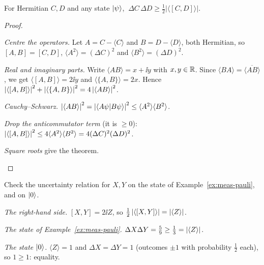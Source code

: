 \begin{theorem}\label{thm:uncertainty}
  For Hermitian $C,D$ and any state $\left|\psi\right\rangle$, $\ \Delta C\,\Delta D\ge\tfrac12\bigl|\langle[C,D]\rangle\bigr|$.
\end{theorem}
\begin{proof}
  \begin{steps}
    \item \emph{Centre the operators.} Let $A=C-\langle C\rangle$ and $B=D-\langle D\rangle$, both Hermitian, so $[A,B]=[C,D]$, $\langle A^2\rangle=(\Delta C)^2$ and $\langle B^2\rangle=(\Delta D)^2$.
    \item \emph{Real and imaginary parts.} Write $\langle AB\rangle=x+\ii y$ with $x,y\in\mathbb{R}$. Since $\langle BA\rangle=\overline{\langle AB\rangle}$, we get $\langle[A,B]\rangle=2\ii y$ and $\langle\{A,B\}\rangle=2x$. Hence $\left|\langle[A,B]\rangle\right|^2+\left|\langle\{A,B\}\rangle\right|^2=4\left|\langle AB\rangle\right|^2$.
    \item \emph{Cauchy--Schwarz.} $\left|\langle AB\rangle\right|^2=\left|\left\langle A\psi\middle|B\psi\right\rangle\right|^2\le\langle A^2\rangle\langle B^2\rangle$.
    \item \emph{Drop the anticommutator term} (it is $\ge0$): $\left|\langle[A,B]\rangle\right|^2\le4\langle A^2\rangle\langle B^2\rangle=4(\Delta C)^2(\Delta D)^2$.
    \item \emph{Square roots} give the theorem. \qedhere
  \end{steps}
\end{proof}

\begin{example}\label{ex:uncertainty-check}
  Check the uncertainty relation for $X,Y$ on the state of Example~\ref{ex:meas-pauli}, and on $\left|0\right\rangle$.
\end{example}
\begin{solution}
  \begin{steps}
    \item \emph{The right-hand side.} $[X,Y]=2\ii Z$, so $\tfrac12\left|\langle[X,Y]\rangle\right|=\left|\langle Z\rangle\right|$.
    \item \emph{The state of Example~\ref{ex:meas-pauli}.} $\Delta X\Delta Y=\tfrac59\ge\tfrac13=\left|\langle Z\rangle\right|$.
    \item \emph{The state $\left|0\right\rangle$.} $\langle Z\rangle=1$ and $\Delta X=\Delta Y=1$ (outcomes $\pm1$ with probability $\tfrac12$ each), so $1\ge1$: equality.
  \end{steps}
\end{solution}

